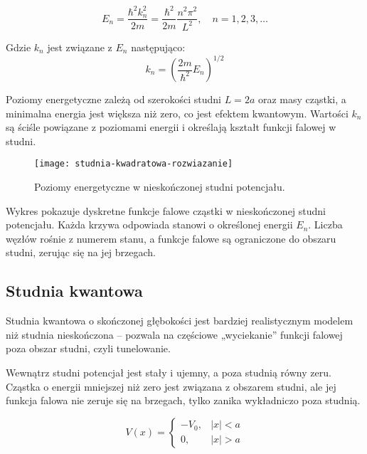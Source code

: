 \begin{equation*}
    E_n = \frac{\hbar^2 k_n^2}{2m} = \frac{\hbar^2}{2m} \frac{n^2 \pi^2}{L^2}, \quad n = 1, 2, 3, \ldots
\end{equation*}


Gdzie $k_n$ jest związane z $E_n$ następująco:
\begin{equation*}
    k_n = \left( \frac{2 m}{\hbar ^2} E_n \right) ^{1/2}
\end{equation*}

Poziomy energetyczne zależą od szerokości studni $L=2a$ oraz masy cząstki, a minimalna energia jest większa niż zero, co jest efektem kwantowym.
Wartości $k_n$ są ściśle powiązane z poziomami energii i określają kształt funkcji falowej w studni. \\

\begin{figure}[H]
    \centering
    \texttt{[image: studnia-kwadratowa-rozwiazanie]}
    \caption{Poziomy energetyczne w nieskończonej studni potencjału.}
    \label{fig:studnia-kwadratowa-rozwiazanie}
\end{figure}

Wykres pokazuje dyskretne funkcje falowe cząstki w nieskończonej studni potencjału.
Każda krzywa odpowiada stanowi o określonej energii $E_n$. Liczba węzłów rośnie z numerem stanu,
a funkcje falowe są ograniczone do obszaru studni, zerując się na jej brzegach.


\subsection{Studnia kwantowa}

Studnia kwantowa o skończonej głębokości jest bardziej realistycznym modelem niż
studnia nieskończona – pozwala na częściowe „wyciekanie” funkcji falowej poza
obszar studni, czyli tunelowanie.

Wewnątrz studni potencjał jest stały i ujemny, a poza studnią równy zeru.
Cząstka o energii mniejszej niż zero jest związana z obszarem studni,
ale jej funkcja falowa nie zeruje się na brzegach, tylko zanika wykładniczo poza studnią.

\begin{equation*}
    V(x) = 
    \begin{cases}
        -V_0, & |x| < a \\
        0, & |x| > a
    \end{cases}
\end{equation*}

